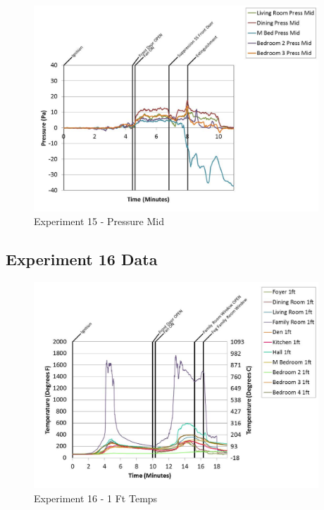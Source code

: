 \documentclass{article}
\begin{document}
\begin{appendices}
	\begin{figure}[h!]
		\centering
		\includegraphics[height=3.05in]{0_Images/Results_Charts/Exp_15_Charts/PressureMid.pdf}
		\caption{Experiment 15 - Pressure Mid}
	\end{figure}
 
	\clearpage

		\clearpage
\clearpage		\large
\subsection{Experiment 16 Data} \label{App:Exp16Results} 

	\begin{figure}[h!]
		\centering
		\includegraphics[height=3.05in]{0_Images/Results_Charts/Exp_16_Charts/1FtTemps.pdf}
		\caption{Experiment 16 - 1 Ft Temps}
	\end{figure}
 


\end{appendices}
\end{document}
